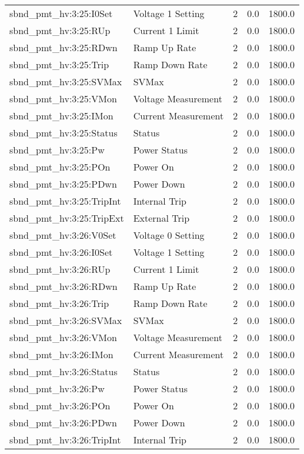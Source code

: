 \begin{center}
\begin{longtable}{l | l l l l }
sbnd\_pmt\_hv:3:25:I0Set & Voltage 1 Setting & 2 & 0.0 & 1800.0\\ 
sbnd\_pmt\_hv:3:25:RUp & Current 1 Limit & 2 & 0.0 & 1800.0\\ 
sbnd\_pmt\_hv:3:25:RDwn & Ramp Up Rate & 2 & 0.0 & 1800.0\\ 
sbnd\_pmt\_hv:3:25:Trip & Ramp Down Rate & 2 & 0.0 & 1800.0\\ 
sbnd\_pmt\_hv:3:25:SVMax & SVMax & 2 & 0.0 & 1800.0\\ 
sbnd\_pmt\_hv:3:25:VMon & Voltage Measurement & 2 & 0.0 & 1800.0\\ 
sbnd\_pmt\_hv:3:25:IMon & Current Measurement & 2 & 0.0 & 1800.0\\ 
sbnd\_pmt\_hv:3:25:Status & Status & 2 & 0.0 & 1800.0\\ 
sbnd\_pmt\_hv:3:25:Pw & Power Status & 2 & 0.0 & 1800.0\\ 
sbnd\_pmt\_hv:3:25:POn & Power On & 2 & 0.0 & 1800.0\\ 
sbnd\_pmt\_hv:3:25:PDwn & Power Down & 2 & 0.0 & 1800.0\\ 
sbnd\_pmt\_hv:3:25:TripInt & Internal Trip & 2 & 0.0 & 1800.0\\ 
sbnd\_pmt\_hv:3:25:TripExt & External Trip & 2 & 0.0 & 1800.0\\ 
sbnd\_pmt\_hv:3:26:V0Set & Voltage 0 Setting & 2 & 0.0 & 1800.0\\ 
sbnd\_pmt\_hv:3:26:I0Set & Voltage 1 Setting & 2 & 0.0 & 1800.0\\ 
sbnd\_pmt\_hv:3:26:RUp & Current 1 Limit & 2 & 0.0 & 1800.0\\ 
sbnd\_pmt\_hv:3:26:RDwn & Ramp Up Rate & 2 & 0.0 & 1800.0\\ 
sbnd\_pmt\_hv:3:26:Trip & Ramp Down Rate & 2 & 0.0 & 1800.0\\ 
sbnd\_pmt\_hv:3:26:SVMax & SVMax & 2 & 0.0 & 1800.0\\ 
sbnd\_pmt\_hv:3:26:VMon & Voltage Measurement & 2 & 0.0 & 1800.0\\ 
sbnd\_pmt\_hv:3:26:IMon & Current Measurement & 2 & 0.0 & 1800.0\\ 
sbnd\_pmt\_hv:3:26:Status & Status & 2 & 0.0 & 1800.0\\ 
sbnd\_pmt\_hv:3:26:Pw & Power Status & 2 & 0.0 & 1800.0\\ 
sbnd\_pmt\_hv:3:26:POn & Power On & 2 & 0.0 & 1800.0\\ 
sbnd\_pmt\_hv:3:26:PDwn & Power Down & 2 & 0.0 & 1800.0\\ 
sbnd\_pmt\_hv:3:26:TripInt & Internal Trip & 2 & 0.0 & 1800.0\\ 

\end{longtable}
\end{center}
